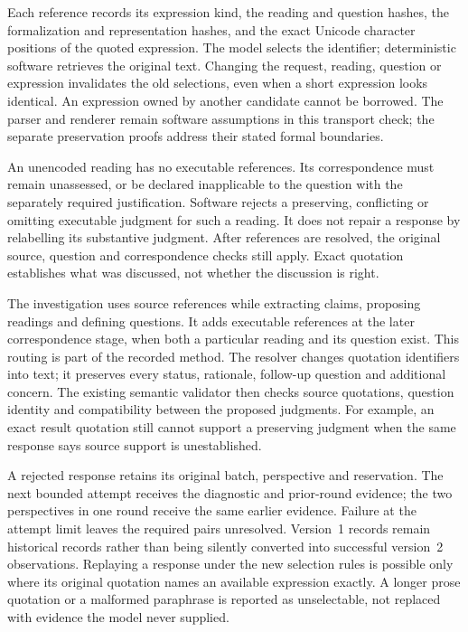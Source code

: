 \documentclass[12pt,a4paper,oneside,openany]{book}
\begin{document}
Each reference records its expression kind, the reading and question hashes,
the formalization and representation hashes, and the exact Unicode character
positions of the quoted expression. The model selects the identifier;
deterministic software retrieves the original text. Changing the request,
reading, question or expression invalidates the old selections, even when a
short expression looks identical. An expression owned by another candidate
cannot be borrowed. The parser and renderer remain software assumptions in
this transport check; the separate preservation proofs address their stated
formal boundaries.

An unencoded reading has no executable references. Its correspondence must
remain unassessed, or be declared inapplicable to the question with the
separately required justification. Software rejects a preserving, conflicting
or omitting executable judgment for such a reading. It does not repair a
response by relabelling its substantive judgment. After references are
resolved, the original source, question and correspondence checks still apply.
Exact quotation establishes what was discussed, not whether the discussion
is right.

The investigation uses source references while extracting claims, proposing
readings and defining questions. It adds executable references at the later
correspondence stage, when both a particular reading and its question exist.
This routing is part of the recorded method. The resolver changes quotation
identifiers into text; it preserves every status, rationale, follow-up question
and additional concern. The existing semantic validator then checks source
quotations, question identity and compatibility between the proposed judgments.
For example, an exact result quotation still cannot support a preserving
judgment when the same response says source support is unestablished.

A rejected response retains its original batch, perspective and reservation.
The next bounded attempt receives the diagnostic and prior-round evidence;
the two perspectives in one round receive the same earlier evidence. Failure
at the attempt limit leaves the required pairs unresolved. Version~1 records
remain historical records rather than being silently converted into successful
version~2 observations. Replaying a response under the new selection rules is
possible only where its original quotation names an available expression
exactly. A longer prose quotation or a malformed paraphrase is reported as
unselectable, not replaced with evidence the model never supplied.
\end{document}
